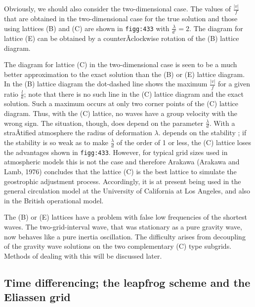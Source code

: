 Obviously, we should also consider the two-dimensional case. The values
of \(\frac{|v|}{f}\) that are obtained in the two-dimensional case for
the true solution and those using lattices (B) and (C) are shown in
\texttt{figg:433} with \(\frac{\lambda}{d'} = 2\). The diagram for
lattice (E) can be obtained by a counterÂ­clockwise rotation of the (B)
lattice diagram.

\begin{figure}
\centering
{}
\caption{}
\end{figure}

The diagram for lattice (C) in the two-dimensional case is seen to be a
much better approximation to the exact solution than the (B) or (E)
lattice diagram. In the (B) lattice diagram the dot-dashed line shows
the maximum \(\frac{|v|}{f}\) for a given ratio \(\frac{l}{k}\); note
that there is no such line in the (C) lattice diagram and the exact
solution. Such a maximum occurs at only two corner points of the (C)
lattice diagram. Thus, with the (C) lattice, no waves have a group
velocity with the wrong sign. The situation, though, does depend on the
parameter \(\frac{\lambda}{d}\). With a straÂ­tified atmosphere the
radius of deformation \(\lambda\). depends on the stability ; if the
stability is so weak as to make \(\frac{\lambda}{d}\) of the order of 1
or less, the (C) lattice loses the advantages shown in
\texttt{figg:433}. However, for typical grid sizes used in atmospheric
models this is not the case and therefore Arakawa (Arakawa and Lamb,
1976) concludes that the lattice (C) is the best lattice to simulate the
geostrophic adjustment process. Accordingly, it is at present being used
in the general circulation model at the University of California at Los
Angeles, and also in the British operational model.

The (B) or (E) lattices have a problem with false low frequencies of the
shortest waves. The two-grid-interval wave, that was stationary as a
pure gravity wave, now behaves like a pure inertia oscillation. The
difficulty arises from decoupling of the gravity wave solutions on the
two complementary (C) type subgrids. Methods of dealing with this will
be discussed later.

\subsection{\texorpdfstring{\textbf{Time differencing; the leapfrog
scheme and the Eliassen
grid}}{Time differencing; the leapfrog scheme and the Eliassen grid}}\label{Section4.4}

